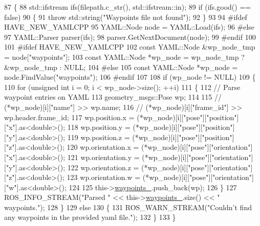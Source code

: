 \begin{DoxyCode}
87 \{
88   std::ifstream ifs(filepath.c\_str(), std::ifstream::in);
89   \textcolor{keywordflow}{if} (ifs.good() == \textcolor{keyword}{false})
90   \{
91     \textcolor{keywordflow}{throw} std::string(\textcolor{stringliteral}{"Waypoints file not found"});
92   \}
93 
94 \textcolor{preprocessor}{#ifdef HAVE\_NEW\_YAMLCPP}
95   YAML::Node node = YAML::Load(ifs);
96 \textcolor{preprocessor}{#else}
97   YAML::Parser parser(ifs);
98   parser.GetNextDocument(node);
99 \textcolor{preprocessor}{#endif}
100 
101 \textcolor{preprocessor}{#ifdef HAVE\_NEW\_YAMLCPP}
102   \textcolor{keyword}{const} YAML::Node &wp\_node\_tmp = node[\textcolor{stringliteral}{"waypoints"}];
103   \textcolor{keyword}{const} YAML::Node *wp\_node = wp\_node\_tmp ? &wp\_node\_tmp : NULL;
104 \textcolor{preprocessor}{#else}
105   \textcolor{keyword}{const} YAML::Node *wp\_node = node.FindValue(\textcolor{stringliteral}{"waypoints"});
106 \textcolor{preprocessor}{#endif}
107 
108   \textcolor{keywordflow}{if} (wp\_node != NULL)
109   \{
110     \textcolor{keywordflow}{for} (\textcolor{keywordtype}{unsigned} \textcolor{keywordtype}{int} i = 0; i < wp\_node->size(); ++i)
111     \{
112       \textcolor{comment}{// Parse waypoint entries on YAML}
113       geometry\_msgs::Pose wp;
114 
115       \textcolor{comment}{// (*wp\_node)[i]["name"] >> wp.name;}
116       \textcolor{comment}{// (*wp\_node)[i]["frame\_id"] >> wp.header.frame\_id;}
117       wp.position.x = (*wp\_node)[i][\textcolor{stringliteral}{"pose"}][\textcolor{stringliteral}{"position"}][\textcolor{stringliteral}{"x"}].as<\textcolor{keywordtype}{double}>();
118       wp.position.y = (*wp\_node)[i][\textcolor{stringliteral}{"pose"}][\textcolor{stringliteral}{"position"}][\textcolor{stringliteral}{"y"}].as<\textcolor{keywordtype}{double}>();
119       wp.position.z = (*wp\_node)[i][\textcolor{stringliteral}{"pose"}][\textcolor{stringliteral}{"position"}][\textcolor{stringliteral}{"z"}].as<\textcolor{keywordtype}{double}>();
120       wp.orientation.x = (*wp\_node)[i][\textcolor{stringliteral}{"pose"}][\textcolor{stringliteral}{"orientation"}][\textcolor{stringliteral}{"x"}].as<\textcolor{keywordtype}{double}>();
121       wp.orientation.y = (*wp\_node)[i][\textcolor{stringliteral}{"pose"}][\textcolor{stringliteral}{"orientation"}][\textcolor{stringliteral}{"y"}].as<\textcolor{keywordtype}{double}>();
122       wp.orientation.z = (*wp\_node)[i][\textcolor{stringliteral}{"pose"}][\textcolor{stringliteral}{"orientation"}][\textcolor{stringliteral}{"z"}].as<\textcolor{keywordtype}{double}>();
123       wp.orientation.w = (*wp\_node)[i][\textcolor{stringliteral}{"pose"}][\textcolor{stringliteral}{"orientation"}][\textcolor{stringliteral}{"w"}].as<\textcolor{keywordtype}{double}>();
124 
125       this->\hyperlink{classsmacc_1_1WaypointNavigator_a59d691f2177430c407b8e27df07552e9}{waypoints\_}.push\_back(wp);
126     \}
127     ROS\_INFO\_STREAM(\textcolor{stringliteral}{"Parsed "} << this->\hyperlink{classsmacc_1_1WaypointNavigator_a59d691f2177430c407b8e27df07552e9}{waypoints\_}.size() << \textcolor{stringliteral}{" waypoints."});
128   \}
129   \textcolor{keywordflow}{else}
130   \{
131     ROS\_WARN\_STREAM(\textcolor{stringliteral}{"Couldn't find any waypoints in the provided yaml file."});
132   \}
133 \}
\end{DoxyCode}
